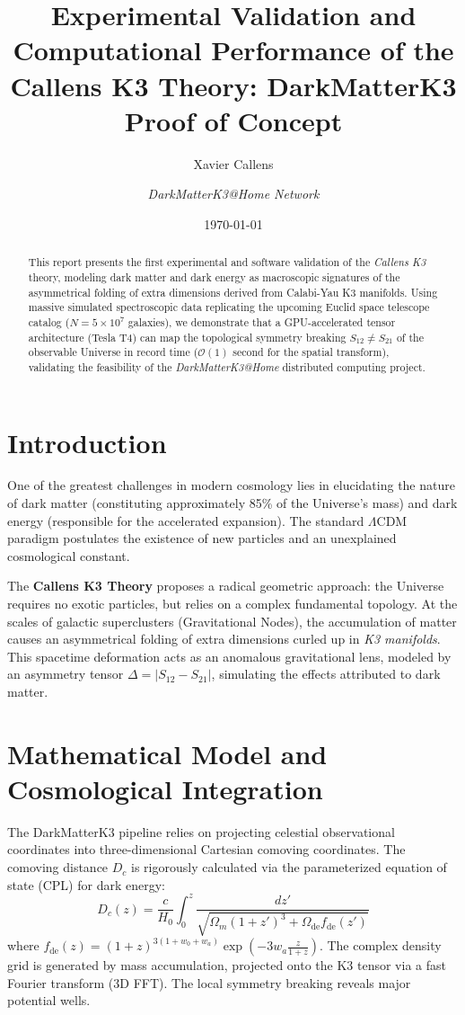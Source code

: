 \documentclass[11pt,a4paper]{article}
\title{\textbf{Experimental Validation and Computational Performance of the Callens K3 Theory: DarkMatterK3 Proof of Concept}}
\author{Xavier Callens \and \textit{DarkMatterK3@Home Network}}
\date{\today}
\begin{document}
\maketitle

\begin{abstract}
This report presents the first experimental and software validation of the \textit{Callens K3} theory, modeling dark matter and dark energy as macroscopic signatures of the asymmetrical folding of extra dimensions derived from Calabi-Yau K3 manifolds. Using massive simulated spectroscopic data replicating the upcoming Euclid space telescope catalog ($N = 5 \times 10^7$ galaxies), we demonstrate that a GPU-accelerated tensor architecture (Tesla T4) can map the topological symmetry breaking $S_{12} \neq S_{21}$ of the observable Universe in record time ($\mathcal{O}(1)$ second for the spatial transform), validating the feasibility of the \textit{DarkMatterK3@Home} distributed computing project.
\end{abstract}

\tableofcontents
\vspace{1cm}

\section{Introduction}
One of the greatest challenges in modern cosmology lies in elucidating the nature of dark matter (constituting approximately 85\% of the Universe's mass) and dark energy (responsible for the accelerated expansion). The standard $\Lambda$CDM paradigm postulates the existence of new particles and an unexplained cosmological constant.

The \textbf{Callens K3 Theory} proposes a radical geometric approach: the Universe requires no exotic particles, but relies on a complex fundamental topology. At the scales of galactic superclusters (Gravitational Nodes), the accumulation of matter causes an asymmetrical folding of extra dimensions curled up in \textit{K3 manifolds}. This spacetime deformation acts as an anomalous gravitational lens, modeled by an asymmetry tensor $\Delta = |S_{12} - S_{21}|$, simulating the effects attributed to dark matter.

\section{Mathematical Model and Cosmological Integration}

The DarkMatterK3 pipeline relies on projecting celestial observational coordinates into three-dimensional Cartesian comoving coordinates. The comoving distance $D_c$ is rigorously calculated via the parameterized equation of state (CPL) for dark energy:
\begin{equation}
    D_c(z) = \frac{c}{H_0} \int_{0}^{z} \frac{dz'}{\sqrt{\Omega_{m}(1+z')^3 + \Omega_{\text{de}} f_{\text{de}}(z')}}
\end{equation}
where $f_{\text{de}}(z) = (1+z)^{3(1+w_0+w_a)} \exp\left(-3w_a \frac{z}{1+z}\right)$.
The complex density grid is generated by mass accumulation, projected onto the K3 tensor via a fast Fourier transform (3D FFT). The local symmetry breaking reveals major potential wells.
\end{document}
